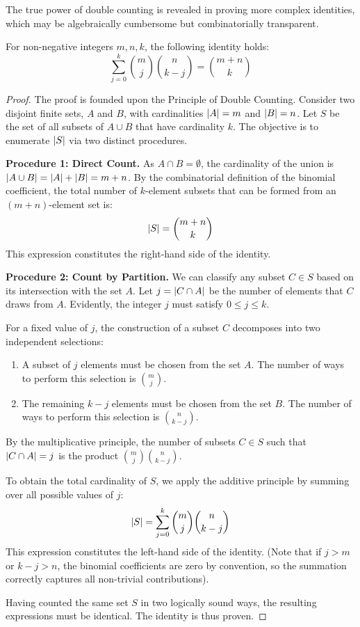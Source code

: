 The true power of double counting is revealed in proving more complex identities, which may be algebraically cumbersome but combinatorially transparent.

\begin{theorem}
For non-negative integers $m, n, k$, the following identity holds:
$$\sum_{j=0}^{k} \binom{m}{j}\binom{n}{k-j} = \binom{m+n}{k}$$
\end{theorem}
\begin{proof}
The proof is founded upon the Principle of Double Counting. Consider two disjoint finite sets, $A$ and $B$, with cardinalities $\left| A \right|=m$ and $\left| B \right|=n$. Let $S$ be the set of all subsets of $A \cup B$ that have cardinality $k$. The objective is to enumerate $\left| S \right|$ via two distinct procedures.

\textbf{Procedure 1: Direct Count.}
As $A \cap B = \emptyset$, the cardinality of the union is $\left| A \cup B \right| = \left| A \right| + \left| B \right| = m+n$. By the combinatorial definition of the binomial coefficient, the total number of $k$-element subsets that can be formed from an $(m+n)$-element set is:
$$\left| S \right| = \binom{m+n}{k}$$
This expression constitutes the right-hand side of the identity.

\textbf{Procedure 2: Count by Partition.}
We can classify any subset $C \in S$ based on its intersection with the set $A$. Let $j = \left| C \cap A \right|$ be the number of elements that $C$ draws from $A$. Evidently, the integer $j$ must satisfy $0 \le j \le k$.

For a fixed value of $j$, the construction of a subset $C$ decomposes into two independent selections:
\begin{enumerate}
    \item A subset of $j$ elements must be chosen from the set $A$. The number of ways to perform this selection is $\binom{m}{j}$.
    \item The remaining $k-j$ elements must be chosen from the set $B$. The number of ways to perform this selection is $\binom{n}{k-j}$.
\end{enumerate}
By the multiplicative principle, the number of subsets $C \in S$ such that $\left| C \cap A \right| = j$ is the product $\binom{m}{j}\binom{n}{k-j}$.

To obtain the total cardinality of $S$, we apply the additive principle by summing over all possible values of $j$:
$$\left| S \right| = \sum_{j=0}^{k} \binom{m}{j}\binom{n}{k-j}$$
This expression constitutes the left-hand side of the identity. (Note that if $j>m$ or $k-j>n$, the binomial coefficients are zero by convention, so the summation correctly captures all non-trivial contributions).

Having counted the same set $S$ in two logically sound ways, the resulting expressions must be identical. The identity is thus proven.
\end{proof}

